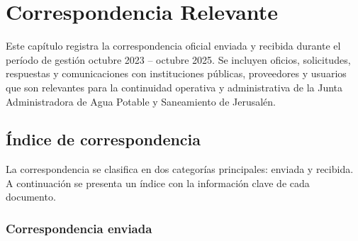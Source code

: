 \chapter{Correspondencia Relevante}

Este capítulo registra la correspondencia oficial enviada y recibida durante el período de gestión octubre 2023 -- octubre 2025. Se incluyen oficios, solicitudes, respuestas y comunicaciones con instituciones públicas, proveedores y usuarios que son relevantes para la continuidad operativa y administrativa de la Junta Administradora de Agua Potable y Saneamiento de Jerusalén.

\section*{Índice de correspondencia}

La correspondencia se clasifica en dos categorías principales: enviada y recibida. A continuación se presenta un índice con la información clave de cada documento.

\subsection*{Correspondencia enviada}

